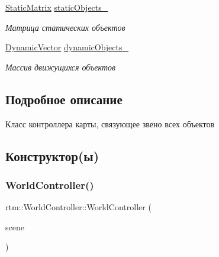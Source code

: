 \begin{DoxyCompactItemize}
\mbox{\label{classrtm_1_1_world_controller_a4d8e2a139009da1c96d4645709379687}} 
\hyperlink{namespacertm_ad5f25e2b28cb92f41fe991faa7fcdd30}{Static\+Matrix} \hyperlink{classrtm_1_1_world_controller_a4d8e2a139009da1c96d4645709379687}{static\+Objects\+\_\+}
\begin{DoxyCompactList}\small\item\em Матрица статических объектов \end{DoxyCompactList}\item 
\mbox{\label{classrtm_1_1_world_controller_a595fed30f15d5f5eee51aa5d829abc7e}} 
\hyperlink{namespacertm_a7fb21a6bf2f6f5947e2875093824c144}{Dynamic\+Vector} \hyperlink{classrtm_1_1_world_controller_a595fed30f15d5f5eee51aa5d829abc7e}{dynamic\+Objects\+\_\+}
\begin{DoxyCompactList}\small\item\em Массив движущихся объектов \end{DoxyCompactList}\end{DoxyCompactItemize}


\subsection{Подробное описание}
Класс контроллера карты, связующее звено всех объектов 

\subsection{Конструктор(ы)}
\mbox{\label{classrtm_1_1_world_controller_a6c7b626c306b63f5799ed3b37e7de7a4}} 
\subsubsection{\texorpdfstring{World\+Controller()}{WorldController()}\hspace{0.1cm}{\footnotesize\ttfamily [1/3]}}
{\footnotesize\ttfamily rtm\+::\+World\+Controller\+::\+World\+Controller (\begin{DoxyParamCaption}\item[{\hyperlink{classrtm_1_1_world_scene}{World\+Scene} $\ast$const}]{scene }\end{DoxyParamCaption})}



